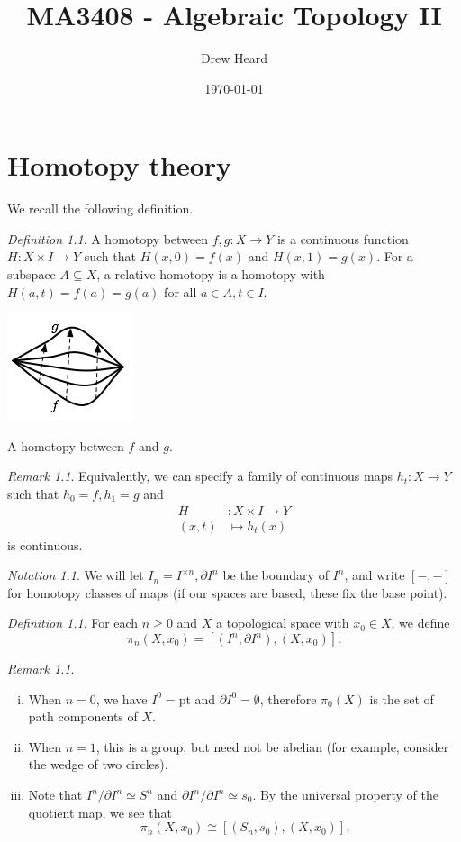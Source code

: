 \documentclass[a4paper]{tufte-book}
\title{MA3408 - Algebraic Topology II}
\date{\today}
\author{Drew Heard}
\theoremstyle{remark}
\newtheorem{Def}[equation]{Definition}
\newtheorem{Not}[equation]{Notation}
\newtheorem{Rem}[equation]{Remark}
\begin{document}
\maketitle
\chapter{Homotopy theory}
We recall the following definition. 
\begin{Def}
	A homotopy between $f,g \colon X \to Y$ is a continuous function $H \colon X \times I \to Y$ such that $H(x,0) = f(x)$ and $H(x,1) = g(x)$. For a subspace $A \subseteq X$, a relative homotopy is a homotopy with $H(a,t) = f(a) = g(a)$ for all $a \in A, t \in I$. 
	\end{Def}
\begin{marginfigure} \centering\includegraphics[scale = 0.5]{path_homotopy}\caption{A homotopy between $f$ and $g$.}\label{fig:marginfig}\end{marginfigure}
\begin{Rem}
	Equivalently, we can specify a family of continuous maps $h_t \colon X \to Y$ such that $h_0 = f , h_1 = g$ and
\[
\begin{split}
H &\colon X \times I \to Y\\
 (x,t) &\mapsto h_t(x)
\end{split}
\]
is continuous.
\end{Rem}
\begin{Not} We will let $I_n = I^{\times n}, \partial I^n$ be the boundary of $I^n$, and write $[-,-]$ for homotopy classes of maps (if our spaces are based, these fix the base point).
\end{Not}
\begin{Def}
	For each $n \ge 0$ and $X$ a topological space with $x_0 \in X$, we define
	\[
\pi_n(X, x_0) = [(I^n, \partial I^n), (X, x_0)].
\]
\end{Def}
\begin{Rem}
	\begin{enumerate}[(i)]
		\item When $n = 0$, we have $I^0 = \text{pt}$ and $\partial I^0 = \emptyset$, therefore $\pi_0(X)$ is the set of path components of $X$.
		\item When $n = 1$, this is a group, but need not be abelian (for example, consider the wedge of two circles).
		\item Note that $I^n / \partial I^n \simeq S^n$ and $\partial I^n / \partial I^n \simeq s_0$. By the universal property of the quotient map, we see that 
		\[
		\pi_n(X, x_0) \cong [(S_n, s_0), (X, x_0)].
\]
	\end{enumerate}
\end{Rem}
\end{document}
